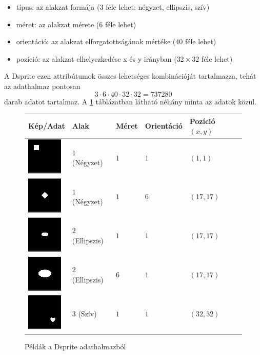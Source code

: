 \begin{itemize}
  \item típus: az alakzat formája ($3$ féle lehet: négyzet, ellipszis, szív)
  \item méret: az alakzat mérete ($6$ féle lehet)
  \item orientáció: az alakzat elforgatottságának mértéke ($40$ féle lehet)
  \item pozíció: az alakzat elhelyezkedése x és y irányban ($32\times32$ féle lehet)
\end{itemize}

A Dsprite ezen attribútumok összes lehetséges kombinációját tartalmazza, tehát az adathalmaz pontosan
$$ 3\cdot6\cdot40\cdot32\cdot32= 737280$$
darab adatot tartalmaz. A \ref{samples} táblázatban látható néhány minta az adatok közül.

\begin{figure}[h!]
\begin{center}

\begin{tabular}{| m{2.5cm} | m{2.5cm} | m{2cm}  | m{2cm} |  m{2.5cm} |}
\hline
Kép/Adat & Alak & Méret & Orientáció & Pozíció $(x,y)$ \\
\hline\hline
\includegraphics{sample00000.png} & $1$ (Négyzet) & $1$ & $1$ & $(1,1)$ \\
\hline
\includegraphics{sample0051616.png} & $1$ (Négyzet) & $1$ & $6$ & $(17,17)$ \\
\hline
\includegraphics{sample1001616.png} & $2$ (Ellipszis) & $1$ & $1$ & $(17,17)$ \\
\hline
\includegraphics{sample1501616.png} & $2$ (Ellipszis) & $6$ & $1$ & $(17,17)$ \\
\hline
\includegraphics{sample2003131.png} & $3$ (Szív) & $1$ & $1$ & $(32,32)$ \\
\hline
\end{tabular}
\end{center}
\caption{Példák a Dsprite adathalmazból}\label{samples}
\end{figure}

